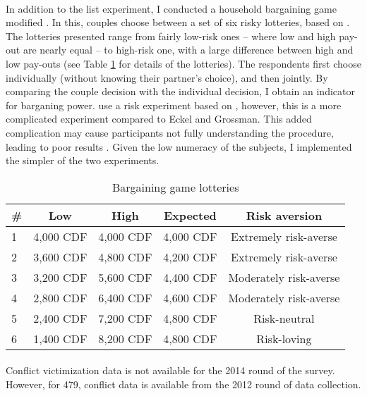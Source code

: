 \documentclass[11pt,a4paper]{scrartcl} %
\begin{document}
 \paragraph{}
 In addition to the list experiment, I conducted a household bargaining game modified \cite{Martinsson2009}. In this, couples choose between a set of six risky lotteries, based on \cite{Eckel2002}. The lotteries presented range from fairly low-risk ones -- where low and high pay-out are nearly equal -- to high-risk one, with a large difference between high and low pay-outs (see Table \ref{tab:bargaining} for details of the lotteries). The respondents first choose individually (without knowing their partner's choice), and then jointly. By comparing the couple decision with the individual decision, I obtain an indicator for barganing power. \cite{Martinsson2009} use a risk experiment based on \cite{Holt2002}, however, this is a more complicated experiment compared to Eckel and Grossman. This added complication may cause participants not fully understanding the procedure, leading to poor results \citep{Dave2010a}. Given the low numeracy of the subjects, I implemented the simpler of the two experiments. 

\begin{table}
	\centering
	\caption{Bargaining game lotteries}
	\label{tab:bargaining}
	\begin{tabular}{l c c c c}
	\hline
	\# & Low & High & Expected & Risk aversion \\
	\hline
	1 & 4,000 CDF & 4,000 CDF & 4,000 CDF & Extremely risk-averse \\
	2 & 3,600 CDF & 4,800 CDF & 4,200 CDF & Extremely risk-averse \\
	3 & 3,200 CDF & 5,600 CDF & 4,400 CDF & Moderately risk-averse \\
	4 & 2,800 CDF & 6,400 CDF & 4,600 CDF & Moderately risk-averse \\
	5 & 2,400 CDF & 7,200 CDF & 4,800 CDF & Risk-neutral \\
	6 & 1,400 CDF & 8,200 CDF & 4,800 CDF & Risk-loving \\
	\end{tabular}
\end{table}

\paragraph{}
Conflict victimization data is not available for the 2014 round of the survey. However, for 479, conflict data is available from the 2012 round of data collection. 
\end{document}

